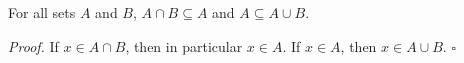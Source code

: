 For all sets $A$ and $B$, $A \cap B \subseteq A$ and $A \subseteq A \cup B$.

\textit{Proof.} If $x \in A \cap B$, then in particular $x \in A$.
If $x \in A$, then $x \in A \cup B$. \hfill$\square$